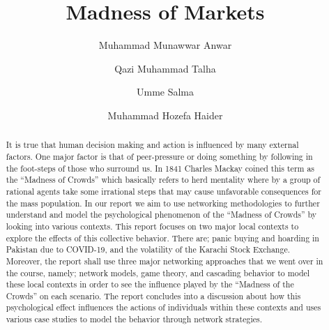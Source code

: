 \documentclass[runningheads]{llncs}
\begin{document}
%
\title{Madness of Markets}
%
% 

\author{Muhammad Munawwar Anwar\and
Qazi Muhammad Talha \and
Umme Salma
\and Muhammad Hozefa Haider}
%
%
%
\maketitle              %
%
\begin{abstract}
It is true that human decision making and action is influenced by many external factors. One major factor is that of peer-pressure or doing something by following in the foot-steps of those who surround us. In 1841 Charles Mackay coined this term as the “Madness of Crowds” which basically refers to herd mentality where by a group of rational agents take some irrational steps that may cause unfavorable consequences for the mass population. In our report we aim to use networking methodologies to further understand and model the psychological phenomenon of the “Madness of Crowds” by looking into various contexts. This report focuses on two major local contexts to explore the effects of this collective behavior. There are; panic buying and hoarding in Pakistan due to COVID-19, and the volatility of the Karachi Stock Exchange. Moreover, the report shall use three major networking approaches that we went over in the course, namely; network models, game theory, and cascading behavior to model these local contexts in order to see the influence played by the “Madness of the Crowds” on each scenario. The report concludes into a discussion about how this psychological effect influences the actions of individuals within these contexts and uses various case studies to model the behavior through network strategies.  

\end{abstract}
\end{document}
